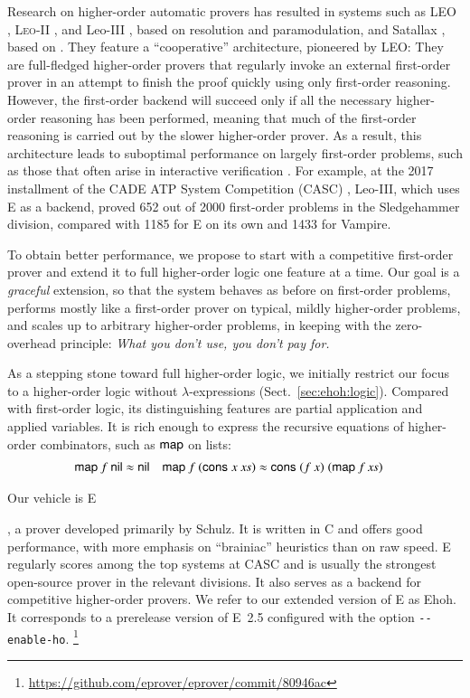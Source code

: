 Research on higher-order automatic provers has resulted
in systems such as LEO \cite{cbmk-98-leo}, \textsc{Leo}-II
\cite{bspt-15-leo2}, and Leo-III \cite{sb-21-leo3},
based on resolution and paramodulation, and Satallax \cite{cb-12-satallax},
based on . They
feature a ``cooperative'' architecture, pioneered by LEO: They
are full-fledged higher-order provers that regularly invoke an
external first-order prover in an attempt to finish the proof quickly using only
first-order reasoning. However, the first-order backend will succeed
only
if all the necessary higher-order reasoning has been performed,
meaning that much of the first-order reasoning is carried out by the
slower higher-order prover. As a result, this architecture leads to
suboptimal performance on largely first-order problems,
such as those that often arise
in interactive verification \cite{ns-13-leo2sh}. For example,
at the 2017 installment of the CADE ATP System Competition (CASC)
\cite{gs-17-casc}, Leo-III, which uses E as a backend, proved
652 out of 2000 first-order problems in the Sledgehammer division, compared
with 1185 for E on its own and 1433 for Vampire.

To obtain better performance, we propose to start with a competitive
first-order prover and extend it to full higher-order logic one
feature at a time.  Our goal is a \emph{graceful} extension, so that
the system behaves as before on first-order problems, performs mostly
like a first-order prover on typical, mildly higher-order problems,
and scales up to arbitrary higher-order problems, in keeping with the
zero-overhead principle: \emph{What you don't use, you
  don't pay for.}

As a stepping stone toward full higher-order logic, we initially restrict our
focus to a higher-order logic without \hbox{$\lambda$-expressions}
(Sect.~\ref{sec:ehoh:logic}). Compared with first-order logic, its distinguishing
features are partial application and applied variables. It
is rich enough to express the recursive equations of higher-order
combinators, such as $\mathsf{map}$ on lists:
%
\begin{align*}
\mathsf{map} \> f \> \mathsf{nil} & \approx \mathsf{nil}
&
\mathsf{map} \> f \> (\mathsf{cons} \; x \; \mathit{xs}) & \approx
\mathsf{cons} \; (f \> x) \; (\mathsf{map} \> f \> \mathit{xs})
\end{align*}

Our vehicle is E\begin{rep} \cite{ss-02-brainiac,scv-19-e23}\end{rep},
a prover developed primarily by Schulz. It is written in C and offers
good performance, with more emphasis on ``brainiac''
heuristics than on raw speed. E regularly scores among the top
systems at CASC and is usually the strongest open-source prover in
the relevant divisions. It also serves as a backend for
competitive higher-order provers. We refer to our extended version of
E as Ehoh. It corresponds to a prerelease version of E~2.5 configured with the
option \verb|--enable-ho|.%
\footnote{\url{https://github.com/eprover/eprover/commit/80946ac}}

